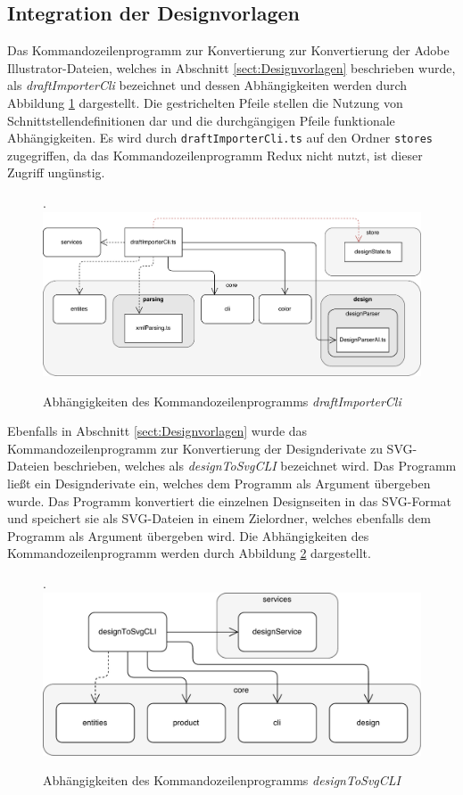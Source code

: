 \subsection{Integration der Designvorlagen}
\label{Kommandozeilenprogramme}
Das Kommandozeilenprogramm zur Konvertierung zur Konvertierung der Adobe Illustrator-Dateien, welches in Abschnitt \ref{sect:Designvorlagen} beschrieben wurde, als \emph{draftImporterCli} bezeichnet und dessen Abhängigkeiten werden durch Abbildung \ref{fig:DesignImport} dargestellt.
Die gestrichelten Pfeile stellen die Nutzung von Schnittstellendefinitionen dar und die durchgängigen Pfeile funktionale Abhängigkeiten. Es wird durch \lstinline|draftImporterCli.ts| auf den Ordner \lstinline|stores| zugegriffen, da das Kommandozeilenprogramm Redux nicht nutzt, ist dieser Zugriff ungünstig.


\begin{figure}[H]
    \centering
    \caption{Abhängigkeiten des Kommandozeilenprogramms \emph{draftImporterCli}}.
    \includegraphics[width=.9\textwidth]{diagrams/Ist-Architektur/draftImporter-analysis.pdf}
    \label{fig:DesignImport}
\end{figure}
Ebenfalls in Abschnitt \ref{sect:Designvorlagen} wurde das Kommandozeilenprogramm zur Konvertierung der Designderivate zu SVG-Dateien beschrieben, welches als  \emph{designToSvgCLI} bezeichnet wird.
Das Programm ließt ein Designderivate ein, welches dem Programm als Argument übergeben wurde. Das Programm konvertiert die einzelnen Designseiten in das SVG-Format und speichert sie als SVG-Dateien in einem Zielordner, welches ebenfalls dem Programm als Argument übergeben wird. 
Die Abhängigkeiten des Kommandozeilenprogramm werden durch Abbildung \ref{fig:DesignToSvg} dargestellt.

\begin{figure}[H]
    \centering
    \caption{Abhängigkeiten des Kommandozeilenprogramms \emph{designToSvgCLI}}.
    \includegraphics[width=.9\textwidth]{diagrams/Ist-Architektur/designToSvgCLI-analysis.pdf}
    \label{fig:DesignToSvg}
\end{figure}

